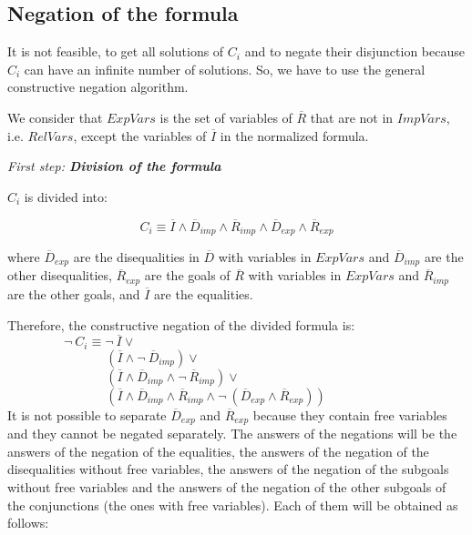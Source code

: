\documentclass{llncs}
\begin{document}
 


\subsection{Negation of the formula}
\label{negation}

It is not feasible, to get all solutions of $C_i$ and to negate their
disjunction because $C_i$ can have an infinite number of solutions. So,
we have to use the general constructive negation algorithm.

We consider that $ExpVars$ is the set of variables of $\overline{R}$
that are not in $ImpVars$, i.e. $RelVars$, except the variables of
$\overline{I}$ in the normalized formula.
\medskip

\noindent
{\em First step: {\bf Division of the formula}}

\noindent
$C_i$ is divided into:

\[C_i \equiv \overline{I} \wedge
        \overline{D}_{imp} \wedge \overline{R}_{imp} \wedge
        \overline{D}_{exp} \wedge \overline{R}_{exp} \]

\noindent
where $\overline{D}_{exp}$ are the disequalities in $\overline{D}$
with variables in $ExpVars$ and $\overline{D}_{imp}$ are the other
disequalities, $\overline{R}_{exp}$ are the goals of $\overline{R}$
with variables in $ExpVars$ and $\overline{R}_{imp}$ are the other
goals, and $\overline{I}$ are the equalities.

Therefore, the constructive negation of the divided formula is: \\

$~~~~~~~~~~~~~~~~~~~~\neg~C_i \equiv \neg~\overline{I} \vee $ \\
$~~~~~~~~~~~~~~~~~~~~~~~~~~~~~~~~~~~(\overline{I} \wedge \neg~\overline{D}_{imp}) \vee  $ \\
$~~~~~~~~~~~~~~~~~~~~~~~~~~~~~~~~~~~(\overline{I} \wedge \overline{D}_{imp}  \wedge \neg~\overline{R}_{imp}) \vee $ \\
$~~~~~~~~~~~~~~~~~~~~~~~~~~~~~~~~~~~( \overline{I} \wedge \overline{D}_{imp} \wedge \overline{R}_{imp} \wedge \neg~(\overline{D}_{exp} \wedge \overline{R}_{exp})) $ \\

\noindent
It is not possible to separate $\overline{D}_{exp}$ and
$\overline{R}_{exp}$ because they contain free variables and
they cannot be negated separately. The answers of the negations
will be the answers of the negation of the equalities, the answers of
the negation of the disequalities without free variables, the answers
of the negation of the subgoals without free variables and the answers
of the negation of the other subgoals of the conjunctions (the ones
with free variables). Each of them will be obtained as follows:
\medskip
\end{document}

